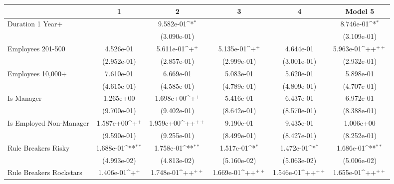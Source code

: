 {
\def\sym#1{\ifmmode^{#1}\else\(^{#1}\)\fi}
\begin{tabular}{l*{5}{c}}
\toprule
                         &\multicolumn{1}{c}{1}&\multicolumn{1}{c}{2}&\multicolumn{1}{c}{3}&\multicolumn{1}{c}{4}&\multicolumn{1}{c}{Model 5}\\
\midrule
Duration 1 Year+         &                    &   9.582e-01\sym{*} &                    &                    &   8.746e-01\sym{*} \\
                         &                    & (3.090e-01)        &                    &                    & (3.109e-01)        \\
\addlinespace
Employees 201-500        &   4.526e-01        &   5.611e-01\sym{+} &   5.135e-01\sym{+} &   4.644e-01        &   5.963e-01\sym{++}\\
                         & (2.952e-01)        & (2.857e-01)        & (2.999e-01)        & (3.001e-01)        & (2.932e-01)        \\
\addlinespace
Employees 10,000+        &   7.610e-01        &   6.669e-01        &   5.083e-01        &   5.620e-01        &   5.898e-01        \\
                         & (4.615e-01)        & (4.585e-01)        & (4.789e-01)        & (4.809e-01)        & (4.707e-01)        \\
\addlinespace
Is Manager               &   1.265e+00        &   1.698e+00\sym{+} &   5.416e-01        &   6.437e-01        &   6.972e-01        \\
                         & (9.700e-01)        & (9.402e-01)        & (8.642e-01)        & (8.570e-01)        & (8.388e-01)        \\
\addlinespace
Is Employed Non-Manager  &   1.587e+00\sym{+} &   1.959e+00\sym{++}&   9.190e-01        &   9.435e-01        &   1.006e+00        \\
                         & (9.590e-01)        & (9.255e-01)        & (8.499e-01)        & (8.427e-01)        & (8.252e-01)        \\
\addlinespace
Rule Breakers Risky      &   1.688e-01\sym{**}&   1.758e-01\sym{**}&   1.517e-01\sym{*} &   1.472e-01\sym{*} &   1.686e-01\sym{**}\\
                         & (4.993e-02)        & (4.813e-02)        & (5.160e-02)        & (5.063e-02)        & (5.006e-02)        \\
\addlinespace
Rule Breakers Rockstars  &   1.406e-01\sym{+} &   1.748e-01\sym{++}&   1.669e-01\sym{++}&   1.546e-01\sym{++}&   1.655e-01\sym{++}\\

\end{tabular}}
